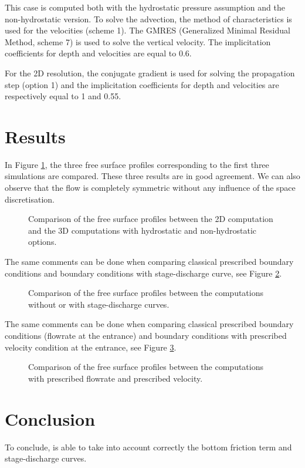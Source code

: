 \bigskip
This case is computed both with the hydrostatic pressure assumption and the non-hydrostatic version. 
To solve the advection, the method of characteristics
is used for the velocities (scheme 1). The GMRES 
(Generalized Minimal Residual Method, scheme 7) is used to solve 
the vertical velocity.  The implicitation coefficients 
for depth and velocities are equal to 0.6.

For the 2D resolution, the conjugate gradient
is used for solving the propagation step (option 1) and
the implicitation coefficients 
for depth and velocities are respectively equal to 1 and 0.55. 

\section{Results}

\bigskip
In Figure \ref{t3d:canal:fig:profiles}, the three free surface profiles
corresponding to the first three simulations are compared.
These three results are in good agreement.
We can also observe that the flow is completely symmetric without
any influence of the space discretisation.

\begin{figure}[!htbp]
 \centering
 \caption{Comparison of the free surface profiles between the 2D 
 computation  and the 3D computations 
 with hydrostatic and non-hydrostatic options. }
 \label{t3d:canal:fig:profiles}
 \end{figure}

The same comments can be done when comparing classical prescribed boundary
conditions and boundary conditions with stage-discharge curve,
see Figure \ref{t3d:canal:fig:profiles:sta-dis-cur}.

\begin{figure}[!htbp]
 \centering
 \caption{Comparison of the free surface profiles between the computations
 without or with stage-discharge curves.}
 \label{t3d:canal:fig:profiles:sta-dis-cur}
\end{figure}

The same comments can be done when comparing classical prescribed boundary
conditions (flowrate at the entrance) and boundary conditions with prescribed
velocity condition at the entrance,
see Figure \ref{t3d:canal:fig:profiles:vit}.

\begin{figure}[!htbp]
 \centering
 \caption{Comparison of the free surface profiles between the computations
 with prescribed flowrate and prescribed velocity.}
 \label{t3d:canal:fig:profiles:vit}
\end{figure}

\section{Conclusion}

To conclude,  is able to take into account correctly the bottom
friction term and stage-discharge curves.
